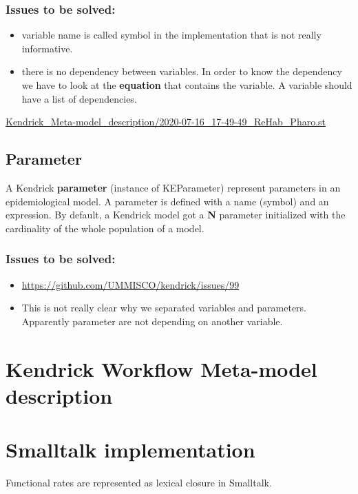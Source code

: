 \documentclass[11pt]{article}
\begin{document}
\subsubsection{Issues to be solved:}
\label{sec:org3fd02f3}
\begin{itemize}
\item variable name is called symbol in the implementation that is not really informative.
\item there is no dependency between variables. In order to know the dependency we have to look at the \textbf{equation} that contains the variable.
A variable should have a list of dependencies.
\end{itemize}

\url{Kendrick\_Meta-model\_description/2020-07-16\_17-49-49\_ReHab\_Pharo.st}

\subsection{Parameter}
\label{sec:orgafdd3bf}
   A Kendrick \textbf{parameter} (instance of KEParameter) represent parameters in an epidemiological model.
A parameter is defined with a name (symbol) and an expression.
By default, a Kendrick model got a \textbf{\textbf{N}} parameter initialized with the cardinality of the whole population of a model.

\subsubsection{Issues to be solved:}
\label{sec:orgdca904d}
\begin{itemize}
\item \url{https://github.com/UMMISCO/kendrick/issues/99}
\item This is not really clear why we separated variables and parameters. Apparently parameter are not depending on another variable.
\end{itemize}

\section{Kendrick Workflow Meta-model description}
\label{sec:org3fe21c1}
\section{Smalltalk implementation}
\label{sec:orgced1d9c}
Functional rates are represented as lexical closure in Smalltalk.
\end{document}
